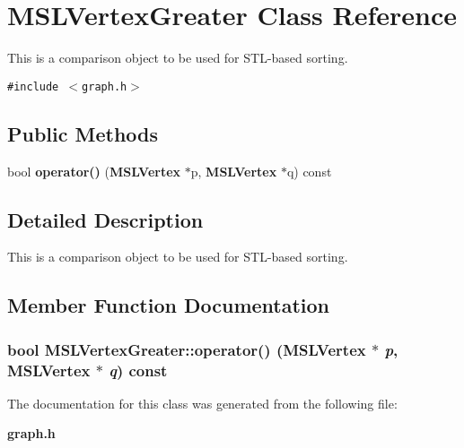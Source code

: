 \section{MSLVertex\-Greater  Class Reference}
\label{class_MSLVertexGreater}
This is a comparison object to be used for STL-based sorting. 


{\tt \#include $<$graph.h$>$}

\subsection*{Public Methods}
\begin{CompactItemize}
\item 
bool {\bf operator()} ({\bf MSLVertex} $\ast$p, {\bf MSLVertex} $\ast$q) const
\end{CompactItemize}


\subsection{Detailed Description}
This is a comparison object to be used for STL-based sorting.



\subsection{Member Function Documentation}
\subsubsection{\setlength{\rightskip}{0pt plus 5cm}bool MSLVertex\-Greater::operator() ({\bf MSLVertex} $\ast$ {\em p}, {\bf MSLVertex} $\ast$ {\em q}) const\hspace{0.3cm}{\tt  [inline]}}\label{class_MSLVertexGreater_a0}




The documentation for this class was generated from the following file:\begin{CompactItemize}
\item 
{\bf graph.h}\end{CompactItemize}
